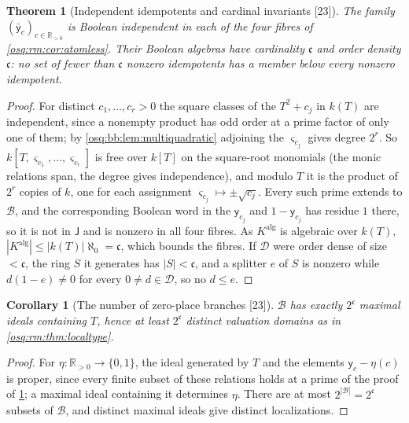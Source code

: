 \documentclass[11pt,letterpaper]{article}
\numberwithin{equation}{section}
\newtheorem{theorem}{Theorem}[section]
\newtheorem{corollary}[corollary]{Corollary}
\theoremstyle{definition}
\theoremstyle{remark}
\theoremstyle{plain}
\newcommand{\R}{\mathbb R}
\newcommand{\src}[1]{\textup{\textsf{[#1]}}}
\begin{document}
\begin{theorem}[Independent idempotents and cardinal invariants \src{23}]\label{osq:rm:thm:cardinality}
The family $(\bar{\mathsf y}_c)_{c\in\R_{>0}}$ is Boolean independent in each of the four fibres of \cref{osq:rm:cor:atomless}. Their Boolean algebras have
cardinality $\mathfrak c$ and order density $\mathfrak c$: no set of fewer than $\mathfrak c$ nonzero idempotents has a member below every nonzero idempotent.
\end{theorem}
\begin{proof}
For distinct $c_1,\dots,c_r>0$ the square classes of the $T^2+c_j$ in $k(T)$ are independent, since a nonempty product has odd order at a prime factor of
only one of them; by \cref{osq:bb:lem:multiquadratic} adjoining the $\varsigma_{c_j}$ gives degree $2^r$. So $k[T,\varsigma_{c_1},\dots,\varsigma_{c_r}]$ is free over
$k[T]$ on the square-root monomials (the monic relations span, the degree gives independence), and modulo $T$ it is the product of $2^r$ copies of $k$,
one for each assignment $\varsigma_{c_j}\mapsto\pm\sqrt{c_j}$. Every such prime extends to $\mathscr B$, and the corresponding Boolean word in the
$\mathsf y_{c_j}$ and $1-\mathsf y_{c_j}$ has residue $1$ there, so it is not in $\mathsf J$ and is nonzero in all four fibres. As $K^{\mathrm{alg}}$ is algebraic over
$k(T)$, $|K^{\mathrm{alg}}|\le|k(T)|\aleph_0=\mathfrak c$, which bounds the fibres. If $\mathcal D$ were order dense of size $<\mathfrak c$, the ring $S$ it generates
has $|S|<\mathfrak c$, and a splitter $e$ of $S$ is nonzero while $d(1-e)\ne0$ for every $0\ne d\in\mathcal D$, so no $d\le e$.
\end{proof}

\begin{corollary}[The number of zero-place branches \src{23}]\label{osq:rm:cor:manyplaces}
$\mathscr B$ has exactly $2^{\mathfrak c}$ maximal ideals containing $T$, hence at least $2^{\mathfrak c}$ distinct valuation domains as in
\cref{osq:rm:thm:localtype}.
\end{corollary}
\begin{proof}
For $\eta:\R_{>0}\to\{0,1\}$, the ideal generated by $T$ and the elements $\mathsf y_c-\eta(c)$ is proper, since every finite subset of these relations holds
at a prime of the proof of \cref{osq:rm:thm:cardinality}; a maximal ideal containing it determines $\eta$. There are at most $2^{|\mathscr B|}=2^{\mathfrak c}$ subsets
of $\mathscr B$, and distinct maximal ideals give distinct localizations.
\end{proof}
\end{document}
